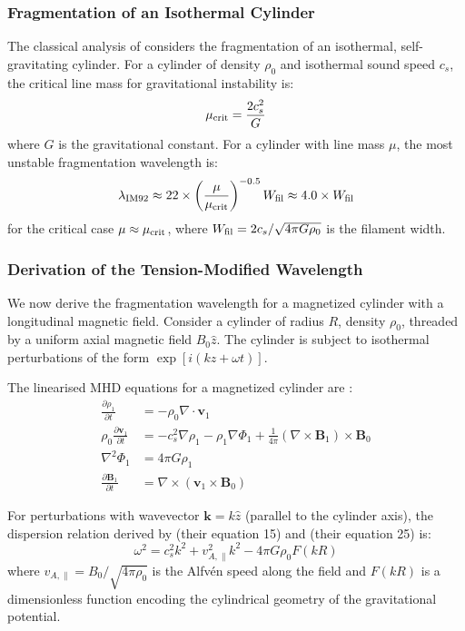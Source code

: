 \documentclass[11pt,a4paper]{article}
\begin{document}
\subsubsection{Fragmentation of an Isothermal Cylinder}

The classical analysis of \citet{Inutsuka1992} considers the fragmentation of an isothermal, self-gravitating cylinder. For a cylinder of density $\rho_0$ and isothermal sound speed $c_s$, the critical line mass for gravitational instability is:
\begin{equation}
\mu_{\rm crit} = \frac{2c_s^2}{G}
\end{equation}
where $G$ is the gravitational constant. For a cylinder with line mass $\mu$, the most unstable fragmentation wavelength is:
\begin{equation}
\lambda_{\rm IM92} \approx 22 \times \left(\frac{\mu}{\mu_{\rm crit}}\right)^{-0.5} W_{\rm fil} \approx 4.0 \times W_{\rm fil}
\label{eq:im92}
\end{equation}
for the critical case $\mu \approx \mu_{\rm crit}$, where $W_{\rm fil} = 2c_s/\sqrt{4\pi G\rho_0}$ is the filament width.

\subsubsection{Derivation of the Tension-Modified Wavelength}

We now derive the fragmentation wavelength for a magnetized cylinder with a longitudinal magnetic field. Consider a cylinder of radius $R$, density $\rho_0$, threaded by a uniform axial magnetic field $B_0 \hat{z}$. The cylinder is subject to isothermal perturbations of the form $\exp[i(kz + \omega t)]$.

The linearised MHD equations for a magnetized cylinder are \citep{Nakamura1993, Hanawa1995}:
\begin{align}
\frac{\partial \rho_1}{\partial t} &= -\rho_0 \nabla \cdot \mathbf{v}_1 \\
\rho_0 \frac{\partial \mathbf{v}_1}{\partial t} &= -c_s^2 \nabla \rho_1 - \rho_1 \nabla \Phi_1 + \frac{1}{4\pi}(\nabla \times \mathbf{B}_1) \times \mathbf{B}_0 \\
\nabla^2 \Phi_1 &= 4\pi G \rho_1 \\
\frac{\partial \mathbf{B}_1}{\partial t} &= \nabla \times (\mathbf{v}_1 \times \mathbf{B}_0)
\end{align}

For perturbations with wavevector $\mathbf{k} = k \hat{z}$ (parallel to the cylinder axis), the dispersion relation derived by \citet{Nakamura1993} (their equation 15) and \citet{Hanawa1995} (their equation 25) is:
\begin{equation}
\omega^2 = c_s^2 k^2 + v_{A,\parallel}^2 k^2 - 4\pi G \rho_0 F(kR)
\end{equation}
where $v_{A,\parallel} = B_0/\sqrt{4\pi\rho_0}$ is the Alfv\'en speed along the field and $F(kR)$ is a dimensionless function encoding the cylindrical geometry of the gravitational potential.
\end{document}
